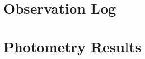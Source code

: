\documentclass[%
aip,
jmp,
reprint,
floatfix
]{revtex4-1}
\begin{document}



	\onecolumngrid
	\appendix
	\section{Observation Log}

	\begin{table}[h!]
		\centering
		
		\label{table:log}
	\end{table}

	\section{Photometry Results} \label{sec:res}
	
	\begin{table}[h!]
		\centering
		
		\label{table:fullresv}
	\end{table}

	\begin{table}[h!]
		\centering
		
		\label{table:fullresb}
	\end{table}
\end{document}
